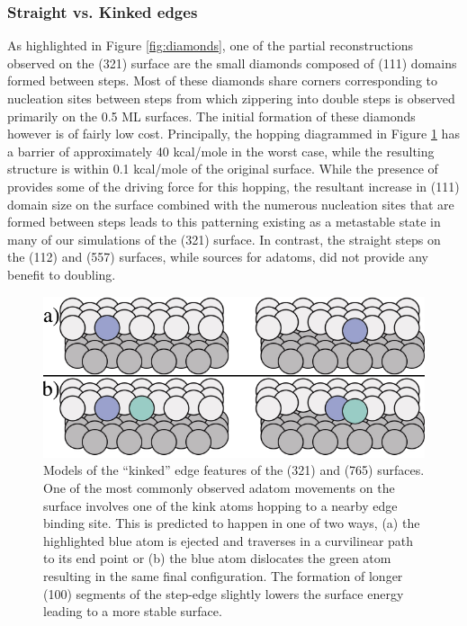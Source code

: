 \subsubsection{Straight vs. Kinked edges}
As highlighted in Figure \ref{fig:diamonds}, one of the partial reconstructions
observed on the (321) surface are the small diamonds composed of (111) domains
formed between steps. Most of these diamonds share corners corresponding to
nucleation sites between steps from which zippering into double steps is
observed primarily on the 0.5 ML surfaces. The initial formation of these
diamonds however is of fairly low cost. Principally, the hopping
diagrammed in Figure \ref{fig:kinkSketch} has a barrier of approximately 40
kcal/mole in the worst case, while the resulting structure is within 0.1 kcal/mole of the original
surface. While the presence of  provides some of the driving force for
this hopping, the resultant increase in (111) domain size on the surface
combined with the numerous nucleation sites that are formed between steps leads
to this patterning existing as a metastable state in many of our simulations of
the (321) surface. In contrast, the straight steps on the (112) and (557)
surfaces, while sources for adatoms, did not provide any benefit to doubling.

\begin{figure}
  \includegraphics[width=\linewidth]{../figures/chap4/kinkMovement.pdf}
  \caption{Models of the ``kinked'' edge features of the (321) and (765)
surfaces.  One of the most commonly observed adatom movements on the surface
involves one of the kink atoms hopping to a nearby edge binding site. This is
predicted to happen in one of two ways, (a) the highlighted blue atom is
ejected and traverses in a curvilinear path to its end point or (b) the blue
atom dislocates the green atom resulting in the same final configuration. The
formation of longer (100) segments of the step-edge slightly lowers the surface
energy leading to a more stable surface.}
  \label{fig:kinkSketch}
\end{figure}

